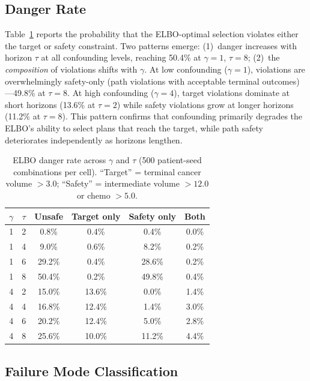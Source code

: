 \documentclass{article}
\begin{document}
\subsection{Danger Rate}

Table~\ref{tab:danger_rate} reports the probability that the ELBO-optimal selection violates either the target or safety constraint. Two patterns emerge: (1)~danger increases with horizon $\tau$ at all confounding levels, reaching 50.4\% at $\gamma{=}1$, $\tau{=}8$; (2)~the \emph{composition} of violations shifts with $\gamma$. At low confounding ($\gamma{=}1$), violations are overwhelmingly safety-only (path violations with acceptable terminal outcomes)---49.8\% at $\tau{=}8$. At high confounding ($\gamma{=}4$), target violations dominate at short horizons (13.6\% at $\tau{=}2$) while safety violations grow at longer horizons (11.2\% at $\tau{=}8$). This pattern confirms that confounding primarily degrades the ELBO's ability to select plans that reach the target, while path safety deteriorates independently as horizons lengthen.

\begin{table}[h]
\centering
\caption{ELBO danger rate across $\gamma$ and $\tau$ (500 patient-seed combinations per cell). ``Target'' = terminal cancer volume $> 3.0$; ``Safety'' = intermediate volume $> 12.0$ or chemo $> 5.0$.}
\label{tab:danger_rate}
\small
\begin{tabular}{cc cccc}
\toprule
$\gamma$ & $\tau$ & Unsafe & Target only & Safety only & Both \\
\midrule
1 & 2 & 0.8\% & 0.4\% & 0.4\% & 0.0\% \\
1 & 4 & 9.0\% & 0.6\% & 8.2\% & 0.2\% \\
1 & 6 & 29.2\% & 0.4\% & 28.6\% & 0.2\% \\
1 & 8 & 50.4\% & 0.2\% & 49.8\% & 0.4\% \\
\midrule
4 & 2 & 15.0\% & 13.6\% & 0.0\% & 1.4\% \\
4 & 4 & 16.8\% & 12.4\% & 1.4\% & 3.0\% \\
4 & 6 & 20.2\% & 12.4\% & 5.0\% & 2.8\% \\
4 & 8 & 25.6\% & 10.0\% & 11.2\% & 4.4\% \\
\bottomrule
\end{tabular}
\end{table}

\subsection{Failure Mode Classification}
\end{document}
